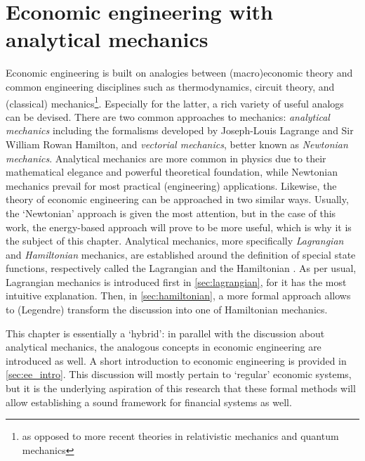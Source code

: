 \chapter{Economic engineering with analytical mechanics}
\label{chap:ee}
Economic engineering is built on analogies between (macro)economic theory and common engineering disciplines such as thermodynamics, circuit theory, and (classical) mechanics\footnote{as opposed to more recent theories in relativistic mechanics and quantum mechanics}. Especially for the latter, a rich variety of useful analogs can be devised. There are two common approaches to mechanics: \emph{analytical mechanics} including the formalisms developed by Joseph-Louis Lagrange and Sir William Rowan Hamilton, and \emph{vectorial mechanics}, better known as \emph{Newtonian mechanics}. Analytical mechanics are more common in physics due to their mathematical elegance and powerful theoretical foundation, while Newtonian mechanics prevail for most practical (engineering) applications. Likewise, the theory of economic engineering can be approached in two similar ways. Usually, the `Newtonian' approach is given the most attention, but in the case of this work, the energy-based approach will prove to be more useful, which is why it is the subject of this chapter. 
Analytical mechanics, more specifically \emph{Lagrangian} and \emph{Hamiltonian} mechanics, are established around the definition of special state functions, respectively called the Lagrangian  and the Hamiltonian . As per usual, Lagrangian mechanics is introduced first in \cref{sec:lagrangian}, for it has the most intuitive explanation. Then, in \cref{sec:hamiltonian}, a more formal approach allows to (Legendre) transform the discussion into one of Hamiltonian mechanics. 

This chapter is essentially a `hybrid': in parallel with the discussion about analytical mechanics, the analogous concepts in economic engineering are introduced as well. A short introduction to economic engineering is provided in \cref{sec:ee_intro}. This discussion will mostly pertain to `regular' economic systems, but it is the underlying aspiration of this research that these formal methods will allow establishing a sound framework for financial systems as well.

